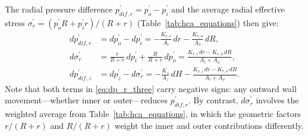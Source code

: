 \documentclass[a4paper,fleqn]{cas-sc}
\begin{document}
The radial pressure difference $p_{dif,r}^{\prime}=p_o^{\prime}-p_i^{\prime}$ and the average radial effective stress $\sigma_r^{\prime}=({p_o^{\prime}R+p_i^{\prime}r})/({R+r})$ (Table~\ref{tab:hca_equations}) then give:
\begin{align}
dp_{dif,r}^{\prime}
  &= dp_o^{\prime}-dp_i^{\prime}
   = -\frac{K_{r,i}}{A_i}\,dr - \frac{K_{r,o}}{A_o}\,dR, \label{eq:dp_r_three}\\[6pt]
d\sigma_r^{\prime}
  &= \frac{r}{R+r}\,dp_i^{\prime} + \frac{R}{R+r}\,dp_o^{\prime}
   = \frac{K_{r,i}\,dr - K_{r,o}\,dR}{A_i+A_o}, \label{eq:dsigma_r_three}\\[6pt]
dp_{dif,z}^{\prime}
  &= dp_z^{\prime}-d\sigma_r^{\prime}
   = -\frac{K_z}{A_z}\,dH - \frac{K_{r,i}\,dr - K_{r,o}\,dR}{A_i+A_o}. \label{eq:dp_z_three}
\end{align}
Note that both terms in \cref{eq:dp_r_three} carry negative signs: any outward wall movement---whether inner or outer---reduces $p_{dif,r}^{\prime}$. By contrast, $d\sigma_r^{\prime}$ involves the weighted average from Table~\ref{tab:hca_equations}, in which the geometric factors $r/(R+r)$ and $R/(R+r)$ weight the inner and outer contributions differently.
\end{document}
